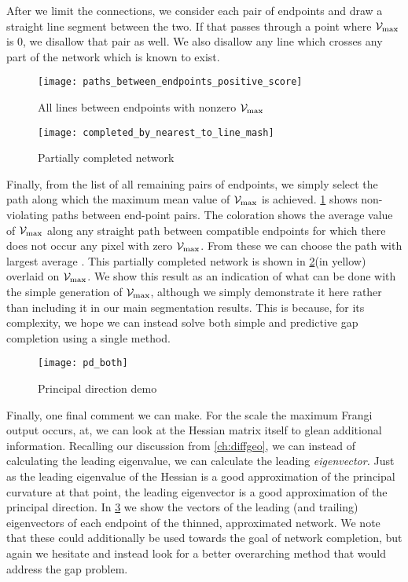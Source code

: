 After we limit the connections, we consider each pair of endpoints and draw a straight line segment between the two. If that passes through a point where $\mathcal{V}_{\max}$ is 0, we disallow that pair as well. We also disallow any line which crosses any part of the network which is known to exist.
\begin{figure}[p]
	\texttt{[image: paths\_between\_endpoints\_positive\_score]}
	\caption{All lines between endpoints with nonzero $\mathcal{V}_{\max}$}
	\label{fig:network-completion-connected-pairs}
\end{figure}
\begin{figure}[p] \centering
	\texttt{[image: completed\_by\_nearest\_to\_line\_mash]}
	\caption{Partially completed network}
	\label{fig:network-completion-end-result}
\end{figure}

Finally, from the list of all remaining pairs of endpoints, we simply select the path along which the maximum mean value of $\mathcal{V}_{\max}$ is achieved. \cref{fig:network-completion-connected-pairs} shows non-violating paths between end-point pairs. The coloration shows the average value of $\mathcal{V}_{\max}$ along any straight path between compatible endpoints for which there does not occur any pixel with zero $\mathcal{V}_{\max}$. From these we can choose the path with largest average \Vmax. This partially completed network is shown in  \cref{fig:network-completion-end-result}(in yellow) overlaid on $\mathcal{V}_{\max}$.
We show this result as an indication of what can be done with the simple generation of $\mathcal{V}_{\max}$, although we simply demonstrate it here rather than including it in our main segmentation results. This is because, for its complexity, we hope we can instead solve both simple and predictive gap completion using a single method.

\begin{figure}[t] \centering
	\texttt{[image: pd\_both]}
	\caption{Principal direction demo}
	\label{fig:pd_demo}
\end{figure}

Finally, one final comment we can make. For the scale the maximum Frangi output occurs, at, we can look at the Hessian matrix itself to glean additional information. Recalling our discussion from \cref{ch:diffgeo}, we can instead of calculating the leading eigenvalue, we can calculate the leading \textit{eigenvector.} Just as the leading eigenvalue of the Hessian is a good approximation of the principal curvature at that point, the leading eigenvector is a good approximation of the principal direction. In \cref{fig:pd_demo} we show the vectors of the leading (and trailing) eigenvectors of each endpoint of the thinned, approximated network. We note that these could additionally be used towards the goal of network completion, but again we hesitate and instead look for a better overarching method that would address the gap problem.


